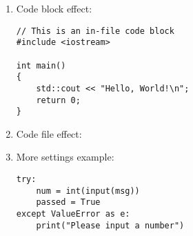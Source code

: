 \documentclass[preview, border={5pt, 15pt}]{standalone}
\begin{document}
\begin{enumerate}
\item Code block effect:
\begin{lstlisting}[style=display-code]
// This is an in-file code block
#include <iostream>

int main()
{
	std::cout << "Hello, World!\n";
	return 0;
}
\end{lstlisting}

\item Code file effect:


\item More settings example:
\begin{lstlisting}[style=more-settings]
try:
	num = int(input(msg))
	passed = True
except ValueError as e:
	print("Please input a number")
\end{lstlisting}
\end{enumerate}
\end{document}
